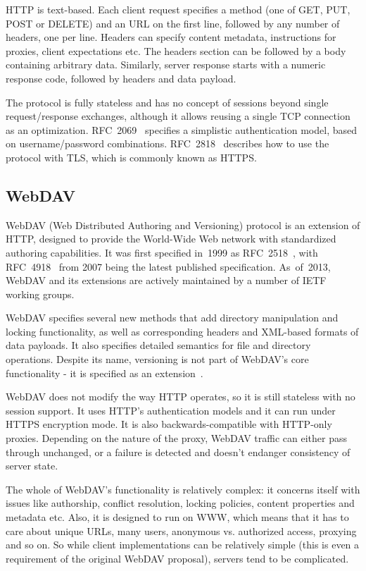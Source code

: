 HTTP is text-based. Each client request specifies a method (one of GET, PUT, POST or DELETE) and an URL on the
first line, followed by any number of headers, one per line.  Headers can specify content metadata,
instructions for proxies, client expectations etc. The headers section can be followed by a body containing
arbitrary data. Similarly, server response starts with a numeric response code, followed by headers and data
payload.

The protocol is fully stateless and has no concept of sessions beyond single request/response exchanges,
although it allows reusing a single TCP connection as an optimization.  RFC~2069~\cite{rfc2069} specifies a
simplistic authentication model, based on username/password combinations. RFC~2818~\cite{rfc2818} describes
how to use the protocol with TLS, which is commonly known as HTTPS.

\subsection{WebDAV}

WebDAV (Web Distributed Authoring and Versioning) protocol is an extension of HTTP, designed to provide the
World-Wide Web network with standardized authoring capabilities. It was first specified in~1999 as
RFC~2518~\cite{rfc2518}, with RFC~4918~\cite{rfc4918} from 2007 being the latest published specification.
As~of~2013, WebDAV and its extensions are actively maintained by a number of IETF working groups.

WebDAV specifies several new methods that add directory manipulation and locking functionality, as well as
corresponding headers and XML-based formats of data payloads. It also specifies detailed semantics for file
and directory operations. Despite its name, versioning is not part of WebDAV's core functionality - it is
specified as an extension~\cite{rfc3253}.

WebDAV does not modify the way HTTP operates, so it is still stateless with no session support. It uses HTTP's
authentication models and it can run under HTTPS encryption mode. It is also backwards-compatible with
HTTP-only proxies. Depending on the nature of the proxy, WebDAV traffic can either pass through unchanged, or
a failure is detected and doesn't endanger consistency of server state.

The whole of WebDAV's functionality is relatively complex: it concerns itself with issues like authorship,
conflict resolution, locking policies, content properties and metadata etc. Also, it is designed to run on
WWW, which means that it has to care about unique URLs, many users, anonymous vs. authorized access, proxying
and so on.  So while client implementations can be relatively simple (this is even a requirement of the
original WebDAV proposal), servers tend to be complicated.

